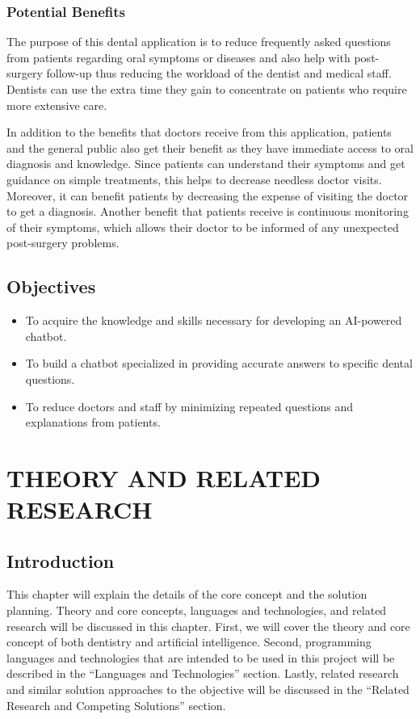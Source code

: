 \documentclass[12pt,oneside,openright,a4paper]{cpe-english-project}
\begin{document}
  \subsection{Potential Benefits}
    \qquad The purpose of this dental application is to reduce frequently asked questions from patients regarding oral symptoms or diseases and also help with post-surgery follow-up thus reducing the workload of the dentist and medical staff. Dentists can use the extra time they gain to concentrate on patients who require more extensive care.\par
    \qquad In addition to the benefits that doctors receive from this application, patients and the general public also get their benefit as they have immediate access to oral diagnosis and knowledge. Since patients can understand their symptoms and get guidance on simple treatments, this helps to decrease needless doctor visits. Moreover, it can benefit patients by decreasing the expense of visiting the doctor to get a diagnosis. Another benefit that patients receive is continuous monitoring of their symptoms, which allows their doctor to be informed of any unexpected post-surgery problems.\par

\section{Objectives}
\begin{itemize}
  \item To acquire the knowledge and skills necessary for developing an AI-powered chatbot. 
  \item To build a chatbot specialized in providing accurate answers to specific dental questions.
  \item To reduce doctors and staff by minimizing repeated questions and explanations from patients.
\end{itemize}

\chapter{THEORY AND RELATED RESEARCH}
\section{Introduction}
\qquad This chapter will explain the details of the core concept and the solution planning. Theory and core concepts, languages and technologies, and related research will be discussed in this chapter. First, we will cover the theory and core concept of both dentistry and artificial intelligence. Second, programming languages and technologies that are intended to be used in this project will be described in the “Languages and Technologies” section. Lastly, related research and similar solution approaches to the objective will be discussed in the “Related Research and Competing Solutions” section.
\end{document}

